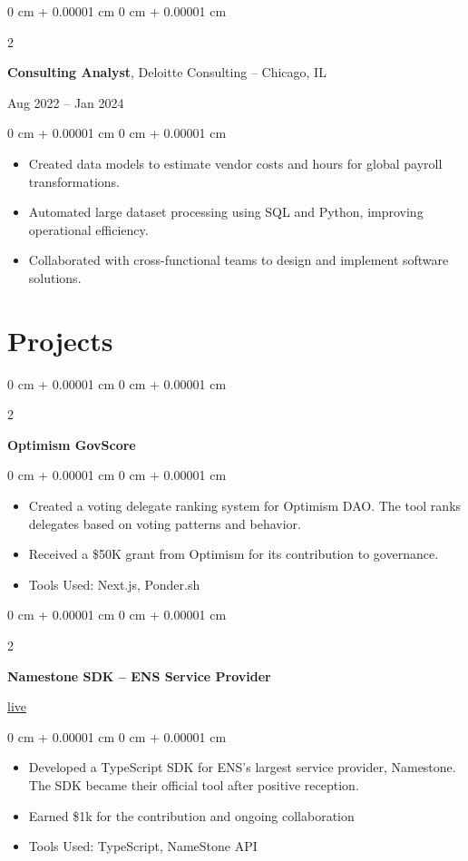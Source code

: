 \documentclass[10pt, letterpaper]{article}
\newenvironment{highlights}{
    \begin{itemize}[
        topsep=0.10 cm,
        parsep=0.10 cm,
        partopsep=0pt,
        itemsep=0pt,
        leftmargin=0 cm + 10pt
    ]
}{
    \end{itemize}
} %
\newenvironment{onecolentry}{
    \begin{adjustwidth}{
        0 cm + 0.00001 cm
    }{
        0 cm + 0.00001 cm
    }
}{
    \end{adjustwidth}
} %
\newenvironment{twocolentry}[2][]{
    \onecolentry
    \def\secondColumn{#2}
    \setcolumnwidth{\fill, 4.5 cm}
    \begin{paracol}{2}
}{
    \switchcolumn \raggedleft \secondColumn
    \end{paracol}
    \endonecolentry
} %
\begin{document}
\vspace{0.2 cm}
\begin{twocolentry}{Aug 2022 – Jan 2024}
    \textbf{Consulting Analyst}, Deloitte Consulting -- Chicago, IL
\end{twocolentry}
\vspace{0.10 cm}
\begin{onecolentry}
\begin{highlights}
    \item Created data models to estimate vendor costs and hours for global payroll transformations.
    \item Automated large dataset processing using SQL and Python, improving operational efficiency.
    \item Collaborated with cross-functional teams to design and implement software solutions.
\end{highlights}
\end{onecolentry}



\section{Projects}

\begin{twocolentry}{2024}
    \textbf{Optimism GovScore}
\end{twocolentry}
\vspace{0.10 cm}
\begin{onecolentry}
\begin{highlights}
    \item Created a voting delegate ranking system for Optimism DAO. The tool ranks delegates based on voting patterns and behavior.
    \item Received a \$50K grant from Optimism for its contribution to governance.
    \item Tools Used: Next.js, Ponder.sh
\end{highlights}
\end{onecolentry}

\vspace{0.2 cm}

\begin{twocolentry}{\href{https://namestone.com}{live}}
    \textbf{Namestone SDK – ENS Service Provider}
\end{twocolentry}
\vspace{0.10 cm}
\begin{onecolentry}
\begin{highlights}
    \item Developed a TypeScript SDK for ENS’s largest service provider, Namestone. The SDK became their official tool after positive reception.
    \item Earned \$1k for the contribution and ongoing collaboration
    \item Tools Used: TypeScript, NameStone API
\end{highlights}
\end{onecolentry}
\end{document}
